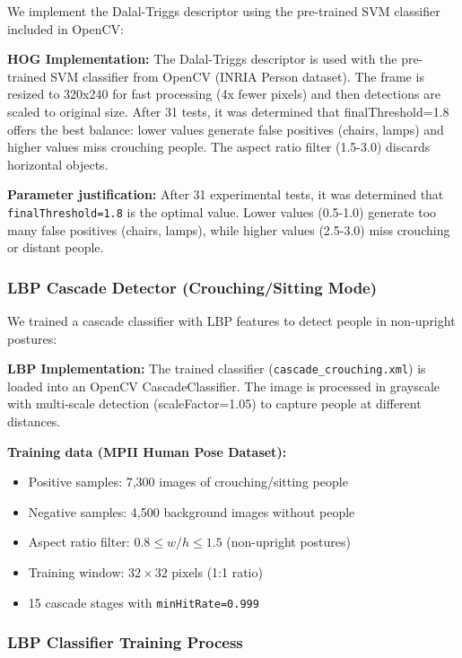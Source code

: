 \documentclass[conference]{IEEEtran}
\begin{document}
We implement the Dalal-Triggs descriptor \cite{dalal2005histograms} using the pre-trained SVM classifier included in OpenCV:

\textbf{HOG Implementation:} The Dalal-Triggs descriptor is used with the pre-trained SVM classifier from OpenCV (INRIA Person dataset). The frame is resized to 320x240 for fast processing (4x fewer pixels) and then detections are scaled to original size. After 31 tests, it was determined that finalThreshold=1.8 offers the best balance: lower values generate false positives (chairs, lamps) and higher values miss crouching people. The aspect ratio filter (1.5-3.0) discards horizontal objects.

\textbf{Parameter justification:} After 31 experimental tests, it was determined that \texttt{finalThreshold=1.8} is the optimal value. Lower values (0.5-1.0) generate too many false positives (chairs, lamps), while higher values (2.5-3.0) miss crouching or distant people.

\subsubsection{LBP Cascade Detector (Crouching/Sitting Mode)}

We trained a cascade classifier with LBP features \cite{ojala2002multiresolution} to detect people in non-upright postures:

\textbf{LBP Implementation:} The trained classifier (\texttt{cascade\_crouching.xml}) is loaded into an OpenCV CascadeClassifier. The image is processed in grayscale with multi-scale detection (scaleFactor=1.05) to capture people at different distances.

\textbf{Training data (MPII Human Pose Dataset):}
\begin{itemize}
    \item Positive samples: 7,300 images of crouching/sitting people
    \item Negative samples: 4,500 background images without people
    \item Aspect ratio filter: $0.8 \leq w/h \leq 1.5$ (non-upright postures)
    \item Training window: $32 \times 32$ pixels (1:1 ratio)
    \item 15 cascade stages with \texttt{minHitRate=0.999}
\end{itemize}

\subsubsection{LBP Classifier Training Process}
\end{document}
